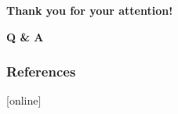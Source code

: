 \begin{frame}

\begin{center}
	\Huge \textbf{Thank you for your attention!}
\end{center}

\end{frame}

\begin{frame}

\begin{center}
\Huge \textbf{Q \& A}
\end{center}

\end{frame}

\begin{frame}[allowframebreaks]
\frametitle{References}
%

\nocite{*}
[online]

\end{frame}










